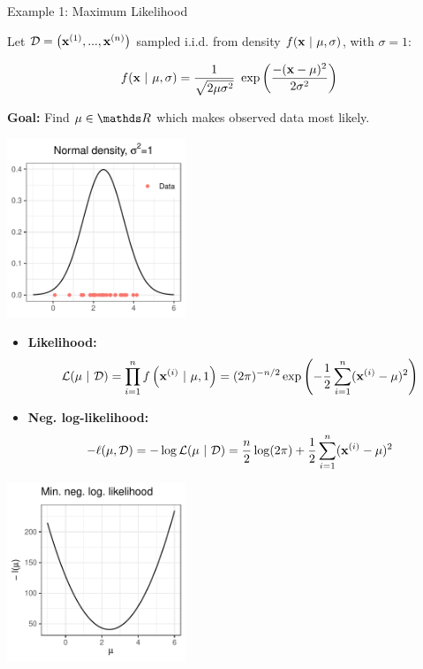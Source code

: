 \begin{vbframe}{Example 1: Maximum Likelihood}

Let $\D = \left(\xi[1], ..., \xi[n]\right)$ sampled i.i.d. from density $f(\xv ~|~ \mu, \sigma)$, with $\sigma = 1$: 

$$
	f(\xv ~|~ \mu, \sigma) = \frac{1}{\sqrt{2 \mu \sigma^{2}}}~\exp\left(\frac{-(\xv-\mu)^{2}}{2\sigma^{2}}\right)
$$

\textbf{Goal:} Find $\mu \in \R$ which makes observed data most likely. 

\begin{center}
	\begin{footnotesize}
	\includegraphics[width=0.4\textwidth, keepaspectratio]{figure_man/ml_normal_example_dnorm.pdf} 
	\end{footnotesize}
\end{center}

\framebreak 

\begin{itemize}
	\item \textbf{Likelihood:} \vspace*{-0.4cm}
 $$\mathcal{L}(\mu~|~\D)= \prod_{i=1}^{n} f\left(\xi~|~\mu, 1\right) = (2\pi)^{-n/2}\exp\left(-\frac{1}{2} \sum_{i=1}^{n} (\xi-\mu)^{2} \right)$$
	\item \textbf{Neg. log-likelihood:} \vspace*{-0.4cm}
$$- \ell(\mu, \D) = - \log \mathcal{L}(\mu~|~\D) = \frac{n}{2} \log(2\pi) + \frac{1}{2} \sum_{i=1}^{n} (\xi-\mu)^{2}$$
\end{itemize}

\vspace*{-0.3cm}

\begin{center}
	\begin{footnotesize}
	\includegraphics[width=0.4\textwidth, keepaspectratio]{figure_man/ml_normal_example_negloglike_nooptim.pdf} 
	\end{footnotesize}
\end{center}
\framebreak 


\end{vbframe}
